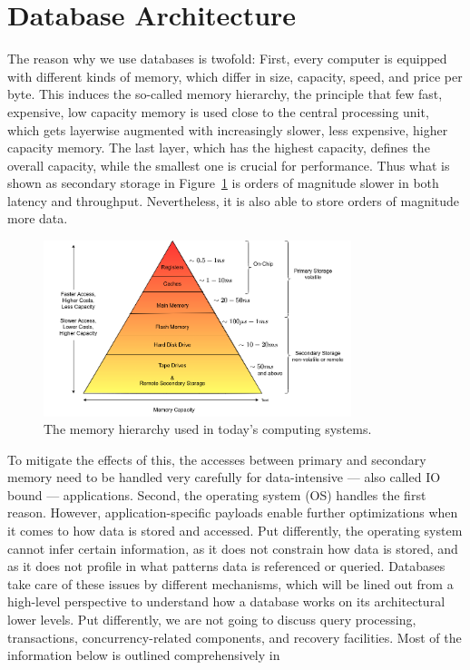 \section{Database Architecture}\label{db-arch}
    The reason why we use databases is twofold:
    First, every computer is equipped with different kinds of memory, which differ in size, capacity, speed, and price per byte. 
    This induces the so-called memory hierarchy, the principle that few fast, expensive, low capacity memory is used close to the central processing unit, which gets layerwise augmented with increasingly slower, less expensive, higher capacity memory. 
    The last layer, which has the highest capacity, defines the overall capacity, while the smallest one is crucial for performance.
    Thus what is shown as secondary storage in Figure~\ref{mem-hier} is orders of magnitude slower in both latency and throughput.
    Nevertheless, it is also able to store orders of magnitude more data. 
    \begin{figure}[htp]
        \begin{center}
        \includegraphics[keepaspectratio,width=0.8\textwidth]{img/04-databases/mem-hierarch.png}
        \end{center}
        \caption{The memory hierarchy used in today's computing systems.} 
        \label{mem-hier}
    \end{figure}
    To mitigate the effects of this, the accesses between primary and secondary memory need to be handled very carefully for data-intensive --- also called IO bound --- applications.
    Second, the operating system (OS) handles the first reason. 
    However, application-specific payloads enable further optimizations when it comes to how data is stored and accessed.
    Put differently, the operating system cannot infer certain information, as it does not constrain how data is stored, and as it does not profile in what patterns data is referenced or queried.
    Databases take care of these issues by different mechanisms, which will be lined out from a high-level perspective to understand how a database works on its architectural lower levels.
    Put differently, we are not going to discuss query processing, transactions, concurrency-related components, and recovery facilities.
    Most of the information below is outlined comprehensively in~\autocite{ramakrishnan2000database, silberschatz1997database}
    
